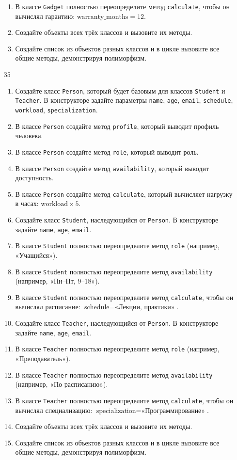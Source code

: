 \begin{enumerate}
\begin{enumerate}
    \item В классе \texttt{Gadget} полностью переопределите метод \texttt{calculate}, чтобы он вычислял гарантию: \( \text{warranty\_months} = 12 \).
    \item Создайте объекты всех трёх классов и вызовите их методы.
    \item Создайте список из объектов разных классов и в цикле вызовите все общие методы, демонстрируя полиморфизм.
\end{enumerate}
\item[35]
\begin{enumerate}
    \item Создайте класс \texttt{Person}, который будет базовым для классов \texttt{Student} и \texttt{Teacher}. В конструкторе задайте параметры \texttt{name}, \texttt{age}, \texttt{email}, \texttt{schedule}, \texttt{workload}, \texttt{specialization}.
    \item В классе \texttt{Person} создайте метод \texttt{profile}, который выводит профиль человека.
    \item В классе \texttt{Person} создайте метод \texttt{role}, который выводит роль.
    \item В классе \texttt{Person} создайте метод \texttt{availability}, который выводит доступность.
    \item В классе \texttt{Person} создайте метод \texttt{calculate}, который вычисляет нагрузку в часах: \( \text{workload} \times 5 \).
    \item Создайте класс \texttt{Student}, наследующийся от \texttt{Person}. В конструкторе задайте \texttt{name}, \texttt{age}, \texttt{email}.
    \item В классе \texttt{Student} полностью переопределите метод \texttt{role} (например, «Учащийся»).
    \item В классе \texttt{Student} полностью переопределите метод \texttt{availability} (например, «Пн–Пт, 9–18»).
    \item В классе \texttt{Student} полностью переопределите метод \texttt{calculate}, чтобы он вычислял расписание: \( \text{schedule} = \text{«Лекции, практики»} \).
    \item Создайте класс \texttt{Teacher}, наследующийся от \texttt{Person}. В конструкторе задайте \texttt{name}, \texttt{age}, \texttt{email}.
    \item В классе \texttt{Teacher} полностью переопределите метод \texttt{role} (например, «Преподаватель»).
    \item В классе \texttt{Teacher} полностью переопределите метод \texttt{availability} (например, «По расписанию»).
    \item В классе \texttt{Teacher} полностью переопределите метод \texttt{calculate}, чтобы он вычислял специализацию: \( \text{specialization} = \text{«Программирование»} \).
    \item Создайте объекты всех трёх классов и вызовите их методы.
    \item Создайте список из объектов разных классов и в цикле вызовите все общие методы, демонстрируя полиморфизм.
\end{enumerate}
\end{enumerate}